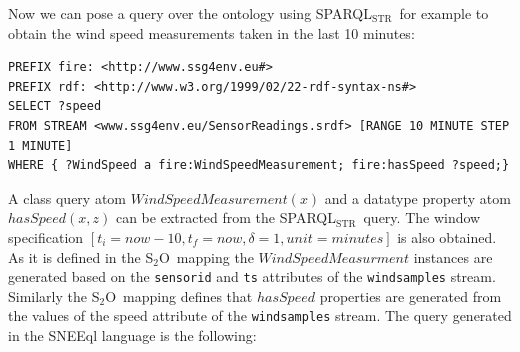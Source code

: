 \documentclass[runningheads,a4paper]{llncs}
\newcommand{\subscript}[1]{\ensuremath{_{\textrm{#1}}}}
\newcommand{\stwoo}{\textsf{S\subscript{2}O}}
\newcommand{\sparqlstr}{SPARQL\subscript{STR}}
\begin{document}
Now we can pose a query over the ontology using \sparqlstr\, for example to obtain the wind speed measurements taken in the last 10 minutes:
%
\begin{lstlisting}[style=SPARQLSTRStyle,language=SPARQLSTR,frame=none]
PREFIX fire: <http://www.ssg4env.eu#>
PREFIX rdf: <http://www.w3.org/1999/02/22-rdf-syntax-ns#>
SELECT ?speed
FROM STREAM <www.ssg4env.eu/SensorReadings.srdf> [RANGE 10 MINUTE STEP 1 MINUTE]
WHERE { ?WindSpeed a fire:WindSpeedMeasurement; fire:hasSpeed ?speed;}
\end{lstlisting}
%
A class query atom $WindSpeedMeasurement(x)$ and a datatype property atom $hasSpeed(x,z)$ can be extracted from the \sparqlstr\ query. The window specification $[t_i=now-10,t_f=now,\delta=1,unit=minutes]$ is also obtained. As it is defined in the \stwoo\ mapping the $WindSpeedMeasurment$ instances are generated based on the \texttt{sensorid} and \texttt{ts} attributes of the \texttt{windsamples} stream.
Similarly the \stwoo\ mapping defines that $hasSpeed$ properties are generated from the values of the speed attribute of the \texttt{windsamples} stream. 
The query generated in the SNEEql language is the following:
\end{document}
